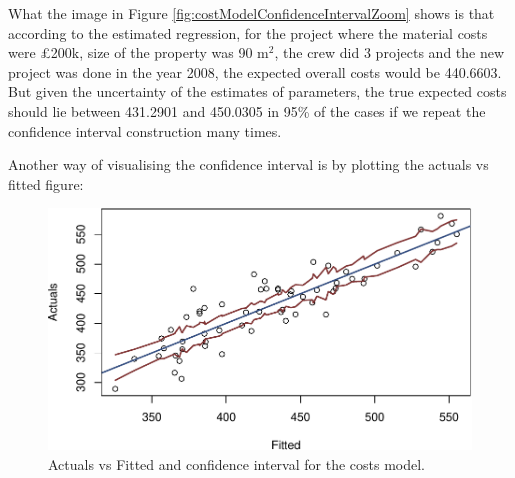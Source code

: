 \documentclass[
]{book}
\newenvironment{Shaded}{\begin{snugshade}}{\end{snugshade}}
\newcommand{\AttributeTok}[1]{\textcolor[rgb]{0.13,0.29,0.53}{#1}}
\newcommand{\DecValTok}[1]{\textcolor[rgb]{0.00,0.00,0.81}{#1}}
\newcommand{\FunctionTok}[1]{\textcolor[rgb]{0.13,0.29,0.53}{\textbf{#1}}}
\newcommand{\NormalTok}[1]{#1}
\newcommand{\SpecialCharTok}[1]{\textcolor[rgb]{0.81,0.36,0.00}{\textbf{#1}}}
\newcommand{\StringTok}[1]{\textcolor[rgb]{0.31,0.60,0.02}{#1}}
\theoremstyle{definition}
\theoremstyle{definition}
\theoremstyle{definition}
\theoremstyle{definition}
\theoremstyle{remark}
\begin{document}
What the image in Figure \ref{fig:costModelConfidenceIntervalZoom} shows is that according to the estimated regression, for the project where the material costs were £200k, size of the property was 90 m\(^2\), the crew did 3 projects and the new project was done in the year 2008, the expected overall costs would be 440.6603. But given the uncertainty of the estimates of parameters, the true expected costs should lie between 431.2901 and 450.0305 in 95\% of the cases if we repeat the confidence interval construction many times.

Another way of visualising the confidence interval is by plotting the actuals vs fitted figure:

\begin{Shaded}
\end{Shaded}

\begin{figure}
\centering
\includegraphics{Svetunkov---Statistics-for-Business-Analytics_files/figure-latex/costModelConfidenceIntervalAvsF-1.pdf}
\caption{\label{fig:costModelConfidenceIntervalAvsF}Actuals vs Fitted and confidence interval for the costs model.}
\end{figure}
\end{document}
